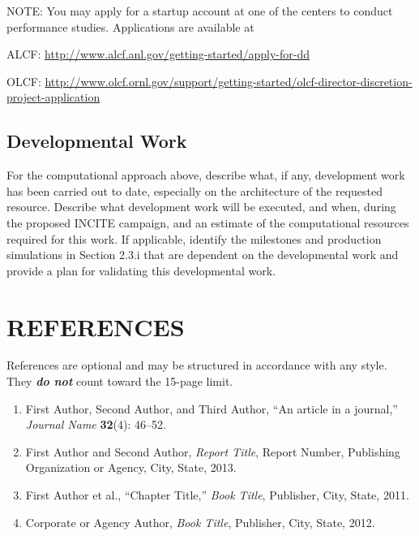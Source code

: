 \documentclass[11pt,letterpaper,english]{article}
\begin{document}
NOTE: You may apply for a startup account at one of the centers to conduct performance studies. Applications are available at

ALCF: {\href{http://www.alcf.anl.gov/getting-started/apply-for-dd}{http://www.alcf.anl.gov/getting-started/apply-for-dd}}

OLCF: {\href{http://www.olcf.ornl.gov/support/getting-started/olcf-director-discretion-project-application}{http://www.olcf.ornl.gov/support/getting-started/olcf-director-discretion-project-application}}

\vspace{-.25in}
\subsection{Developmental Work}
\vspace{-.2in}

For the computational approach above, describe what, if any, development work has been carried out to date, especially on the architecture of the requested resource. Describe what development work will be executed, and when, during the proposed INCITE campaign, and an estimate of the computational resources required for this work.  If applicable, identify the milestones and production simulations in Section 2.3.i that are dependent on the developmental work and provide a plan for validating this developmental work.

\vspace{-.25in}
\section{REFERENCES}
\vspace{-.15in}

References are optional and may be structured in accordance with any style. They {\bf \em {do not}} count toward the 15-page limit.
\vspace{-.15in}
\begin{enumerate}\itemsep0pt
\item First Author, Second Author, and Third Author, ``An article in a journal,'' {\em Journal Name} {\bf 32}(4): 46--52.\\
\item First Author and Second Author, {\em Report Title}, Report Number, Publishing Organization or Agency, City, State, 2013.
\item First Author et al., ``Chapter Title,'' {\em Book Title}, Publisher, City, State, 2011.
\item Corporate or Agency Author, {\em Book Title}, Publisher, City, State, 2012.
\end{enumerate}
\end{document}
